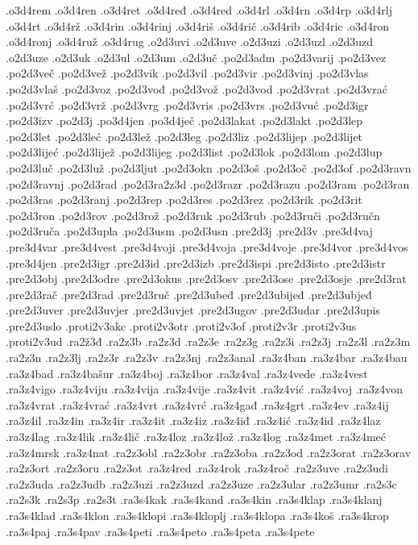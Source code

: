 {.o3d4rem
.o3d4ren
.o3d4ret
.o3d4ređ
.o3d4red
.o3d4rl
.o3d4rn
.o3d4rp
.o3d4rlj
.o3d4rt
.o3d4rž
.o3d4rin
.o3d4rinj
.o3d4riš
.o3d4rič
.o3d4rib
.o3d4ric
.o3d4ron
.o3d4ronj
.o3d4ruž
.o3d4rug
.o2d3uvi
.o2d3uve
.o2d3uzi
.o2d3uzl
.o2d3uzd
.o2d3uze
.o2d3uk
.o2d3ul
.o2d3um
.o2d3uč
.po2d3adm
.po2d3varij
.po2d3vez
.po2d3več
.po2d3vež
.po2d3vik
.po2d3vil
.po2d3vir
.po2d3vinj
.po2d3vlas
.po2d3vlaš
.po2d3voz
.po2d3vođ
.po2d3vož
.po2d3vod
.po2d3vrat
.po2d3vrać
.po2d3vrć
.po2d3vrž
.po2d3vrg
.po2d3vris
.po2d3vrs
.po2d3vuć
.po2d3igr
.po2d3izv
.po2d3j
.po3d4jen
.po3d4ječ
.po2d3lakat
.po2d3lakt
.po2d3lep
.po2d3let
.po2d3leć
.po2d3lež
.po2d3leg
.po2d3liz
.po2d3lijep
.po2d3lijet
.po2d3lijeć
.po2d3lijež
.po2d3lijeg
.po2d3list
.po2d3lok
.po2d3lom
.po2d3lup
.po2d3luč
.po2d3luž
.po2d3ljut
.po2d3okn
.po2d3oš
.po2d3oč
.po2d3of
.po2d3ravn
.po2d3ravnj
.po2d3rad
.po2d3ra2z3d
.po2d3razr
.po2d3razu
.po2d3ram
.po2d3ran
.po2d3ras
.po2d3ranj
.po2d3rep
.po2d3res
.po2d3rez
.po2d3rik
.po2d3rit
.po2d3ron
.po2d3rov
.po2d3rož
.po2d3ruk
.po2d3rub
.po2d3ruči
.po2d3ručn
.po2d3ruča
.po2d3upla
.po2d3usm
.po2d3usn
.pre2d3j
.pre2d3v
.pre3d4vaj
.pre3d4var
.pre3d4vest
.pre3d4voji
.pre3d4voja
.pre3d4voje
.pre3d4vor
.pre3d4vos
.pre3d4jen
.pre2d3igr
.pre2d3id
.pre2d3izb
.pre2d3ispi
.pre2d3isto
.pre2d3istr
.pre2d3obj
.pre2d3odre
.pre2d3okus
.pre2d3osv
.pre2d3ose
.pre2d3osje
.pre2d3rat
.pre2d3rač
.pre2d3rad
.pre2d3ruč
.pre2d3ubeđ
.pre2d3ubijeđ
.pre2d3ubjeđ
.pre2d3uver
.pre2d3uvjer
.pre2d3uvjet
.pre2d3ugov
.pre2d3udar
.pre2d3upis
.pre2d3uslo
.proti2v3akc
.proti2v3otr
.proti2v3of
.proti2v3r
.proti2v3us
.proti2v3ud
.ra2ž3đ
.ra2z3b
.ra2z3d
.ra2z3e
.ra2z3g
.ra2z3i
.ra2z3j
.ra2z3l
.ra2z3m
.ra2z3n
.ra2z3lj
.ra2z3r
.ra2z3v
.ra2z3nj
.ra2z3anal
.ra3z4ban
.ra3z4bar
.ra3z4bau
.ra3z4bad
.ra3z4bašur
.ra3z4boj
.ra3z4bor
.ra3z4val
.ra3z4vede
.ra3z4vest
.ra3z4vigo
.ra3z4viju
.ra3z4vija
.ra3z4vije
.ra3z4vit
.ra3z4vić
.ra3z4voj
.ra3z4von
.ra3z4vrat
.ra3z4vrać
.ra3z4vrt
.ra3z4vrć
.ra3z4gađ
.ra3z4grt
.ra3z4ev
.ra3z4ij
.ra3z4il
.ra3z4in
.ra3z4ir
.ra3z4it
.ra3z4iz
.ra3z4iđ
.ra3z4ić
.ra3z4id
.ra3z4laz
.ra3z4lag
.ra3z4lik
.ra3z4lič
.ra3z4loz
.ra3z4lož
.ra3z4log
.ra3z4met
.ra3z4meć
.ra3z4mrsk
.ra3z4nat
.ra2z3obl
.ra2z3obr
.ra2z3oba
.ra2z3od
.ra2z3orat
.ra2z3orav
.ra2z3ort
.ra2z3oru
.ra2z3ot
.ra3z4red
.ra3z4rok
.ra3z4roč
.ra2z3uve
.ra2z3udi
.ra2z3uda
.ra2z3udb
.ra2z3uzi
.ra2z3uzd
.ra2z3uze
.ra2z3ular
.ra2z3umr
.ra2s3c
.ra2s3k
.ra2s3p
.ra2s3t
.ra3s4kak
.ra3s4kand
.ra3s4kin
.ra3s4klap
.ra3s4klanj
.ra3s4klad
.ra3s4klon
.ra3s4klopi
.ra3s4kloplj
.ra3s4klopa
.ra3s4koš
.ra3s4krop
.ra3s4paj
.ra3s4pav
.ra3s4peti
.ra3s4peto
.ra3s4peta
.ra3s4pete
}
